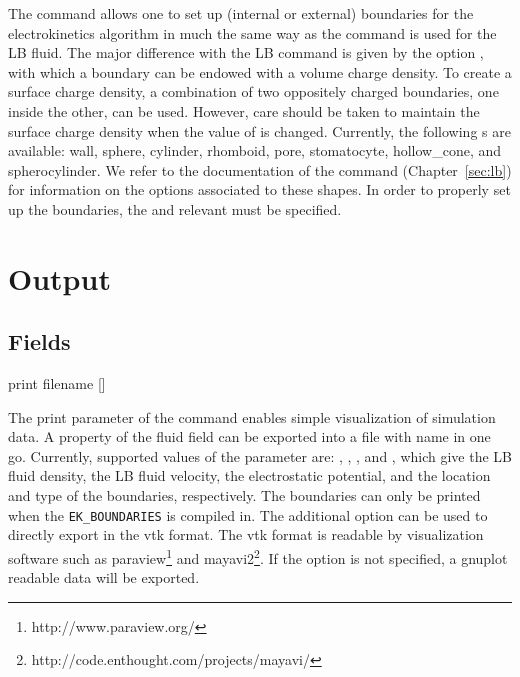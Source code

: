 \begin{essyntax}
  \begin{features}
  \end{features}
\end{essyntax}
The  command allows one to set up (internal or external) boundaries
for the electrokinetics algorithm in much the same way as the  
command is used for the LB fluid. The major difference with the LB command is 
given by the option , with which a boundary can be endowed 
with a volume charge density. To create a surface charge density, a combination 
of two oppositely charged boundaries, one inside the other, can be used. 
However, care should be taken to maintain the surface charge density when the
value of  is changed. Currently, the following s are 
available: wall, sphere, cylinder, rhomboid, pore, stomatocyte, hollow_cone, and spherocylinder. We refer to 
the documentation of the  command (Chapter~\ref{sec:lb}) for
information on the options  associated to these shapes. In
order to properly set up the boundaries, the  and relevant
 must be specified.

\section{\label{ssec:ek-output}Output}

\subsection{\label{ssec:ek-output-fields}Fields}

\begin{essyntax}
  print 
  filename []
  \begin{features}
  \end{features}
\end{essyntax}
The print parameter of the  command enables simple 
visualization of simulation data. A property of the fluid field can be exported
into a file with name  in one go. Currently, supported values of
the parameter  are: , , 
, and , which give the LB fluid density, the LB 
fluid velocity, the electrostatic potential, and the location and type of the
boundaries, respectively. The boundaries can only be printed when the 
\texttt{EK_BOUNDARIES} is compiled in. The additional option  can be
used to directly export in the vtk format. The vtk format is readable
by visualization software such as paraview\footnote{http://www.paraview.org/}
and mayavi2\footnote{http://code.enthought.com/projects/mayavi/}. If the 
 option is not specified, a gnuplot readable data will be exported.

